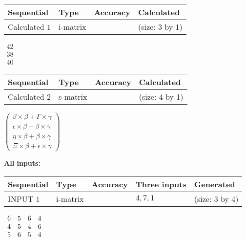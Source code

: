 \documentclass[12pt]{article}
\begin{document}
   
  
  
\noindent\begin{tabular}{|l|l|l|l|}
\hline
 Sequential & Type & Accuracy & Calculated \\ 
\hline
 
 
  Calculated $           1$ & i-matrix &  & 
 (size:           3 by           1)
 \\  \hline  
 \end{tabular}
   
   
$\begin{array}{
 c
 }
          42 \\ 
          38 \\ 
          40
 \end{array}  $ 
  
  
\noindent\begin{tabular}{|l|l|l|l|}
\hline
 Sequential & Type & Accuracy & Calculated \\ 
\hline
 
 
  Calculated $           2$ & s-matrix & & 
 (size:           4 by           1)
 \\  \hline  
 \end{tabular}
   
   
 $   \left( \begin{array}
 {
 c
 }
 \beta \times  \beta   +  \Gamma \times  \gamma \\ 
 \epsilon \times  \beta   +  \beta \times  \gamma \\ 
 \eta \times  \beta   +  \beta \times  \gamma \\ 
                    \Xi \times  \beta   +  \epsilon \times  \gamma
 \end{array} \right) $ 
   
   
\noindent\vspace{0.1in}\hspace{-0.08in} {\textbf{\Large{All inputs: }}}
   
   
  
  
\noindent\begin{tabular}{|l|l|l|l|l|}
\hline
 Sequential & Type & Accuracy & Three inputs & Generated \\ 
\hline
 
 
  INPUT $           1$ & i-matrix &  & $
 4
 , 
 7
 , 
 1
 $ & (size:           3 by           4)
 \\  \hline  
 \end{tabular}
   
   
 $\begin{array}{
 c
 c
 c
 c
 }
           6 & 
           5 & 
           6 & 
           4 \\ 
           4 & 
           5 & 
           4 & 
           6 \\ 
           5 & 
           6 & 
           5 & 
           4
\end{array}  $ 
  
\end{document}
